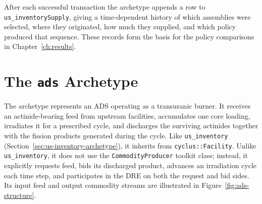 After each successful transaction the archetype appends a row to
\texttt{us\_inventorySupply}, giving a time-dependent history of which assemblies
were selected, where they originated, how much they supplied, and which policy
produced that sequence. These records form the basis for the policy
comparisons in Chapter~\ref{ch:results}.

\section{The \texttt{ads} Archetype}
\label{sec:ads-archetype}

The archetype represents an \gls{ADS} operating as a transuranic
burner. It receives an actinide-bearing feed from upstream facilities,
accumulates one core loading, irradiates it for a prescribed cycle, and
discharges the surviving actinides together with the fission products generated
during the cycle. Like \texttt{us\_inventory}
(Section~\ref{sec:us-inventory-archetype}), it inherits from
\texttt{cyclus::Facility}. Unlike \texttt{us\_inventory}, it does not use the
\texttt{CommodityProducer} toolkit class; instead, it explicitly requests feed,
bids its discharged product, advances an irradiation cycle each time step, and
participates in the \gls{DRE} on both the request and bid sides.
Its input feed and output commodity streams are illustrated in
Figure~\ref{fig:ads-structure}.

